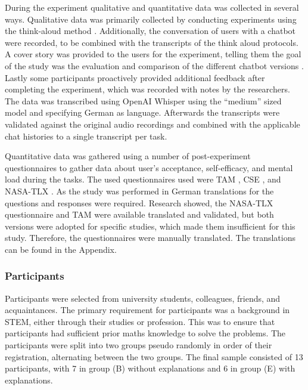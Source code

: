 During the experiment qualitative and quantitative data was collected in several ways. Qualitative data was primarily collected by conducting experiments using the think-aloud method \parencite{VanSomeren1994}. Additionally, the conversation of users with a chatbot were recorded, to be combined with the transcripts of the think aloud protocols. A cover story was provided to the users for the experiment, telling them the goal of the study was the evaluation and comparison of the different chatbot versions \parencite{VanSomeren1994, Jussupow2021}. Lastly some participants proactively provided additional feedback after completing the experiment, which was recorded with notes by the researchers. The data was transcribed using OpenAI Whisper \parencite{Radford2022} using the “medium” sized model and specifying German as language. Afterwards the transcripts were validated against the original audio recordings and combined with the applicable chat histories to a single transcript per task.

Quantitative data was gathered using a number of post-experiment questionnaires to gather data about user's acceptance, self-efficacy, and mental load during the tasks. The used questionnaires used were \ac{TAM} \parencite{Davis1989}, \ac{CSE} \parencite{Compeau1995}, and NASA-\ac{TLX} \parencite{Hart1988}. As the study was performed in German translations for the questions and responses were required. Research showed, the NASA-\ac{TLX} questionnaire \parencite{Flaegel2019} and \ac{TAM} \parencite{Jockisch2010} were available translated and validated, but both versions were adopted for specific studies, which made them insufficient for this study. Therefore, the questionnaires were manually translated. The translations can be found in the Appendix.

\subsubsection{Participants} \label{sssec:participants}

Participants were selected from university students, colleagues, friends, and acquaintances. The primary requirement for participants was a background in \ac{STEM}, either through their studies or profession. This was to ensure that participants had sufficient prior maths knowledge to solve the problems. The participants were split into two groups pseudo randomly in order of their registration, alternating between the two groups. The final sample consisted of 13 participants, with 7 in group (B) without explanations and 6 in group (E) with explanations.

